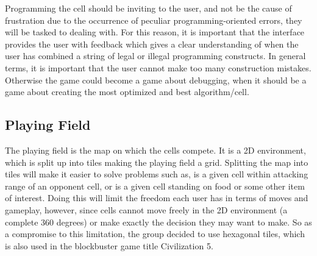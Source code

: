 Programming the cell should be inviting to the user, and not be the cause of frustration due to the occurrence of peculiar programming-oriented errors, they will be tasked to dealing with.
For this reason, it is important that the interface provides the user with feedback which gives a clear understanding of when the user has combined a string of legal or illegal programming constructs.
In general terms, it is important that the user cannot make too many construction mistakes.
Otherwise the game could become a game about debugging, when it should be a game about creating the most optimized and best algorithm/cell.

\subsection{Playing Field}

The playing field is the map on which the cells compete.
It is a 2D environment, which is split up into tiles making the playing field a grid.
Splitting the map into tiles will make it easier to solve problems such as, is a given cell within attacking range of an opponent cell, or is a given cell standing on food or some other item of interest.
Doing this will limit the freedom each user has in terms of moves and gameplay, however, since cells cannot move freely in the 2D environment (a complete 360 degrees) or make exactly the decision they may want to make. 
So as a compromise to this limitation, the group decided to use hexagonal tiles, which is also used in the blockbuster game title Civilization 5.